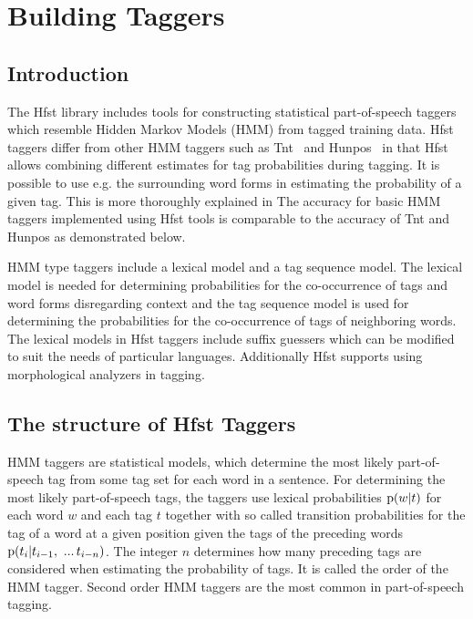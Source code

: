 \documentclass{llncs}
\begin{document}


\section{Building Taggers}\label{PosTools}

\subsection{Introduction}

The Hfst library includes tools for constructing statistical
part-of-speech taggers which resemble Hidden Markov Models (HMM) from
tagged training data. Hfst taggers differ from other HMM taggers such
as Tnt~\cite{Brants:2000} and Hunpos~\cite{Halascy:2007} in that Hfst
allows combining different estimates for tag probabilities during
tagging. It is possible to use e.g. the surrounding word forms in
estimating the probability of a given tag. This is more thoroughly
explained in \cite{silfverberg/2010/icetal,silfverberg/2011/nodalida} The
accuracy for basic HMM taggers implemented using Hfst tools is
comparable to the accuracy of Tnt and Hunpos as demonstrated below.

HMM type taggers include a lexical model and a tag sequence model. The
lexical model is needed for determining probabilities for the
co-occurrence of tags and word forms disregarding context and the tag
sequence model is used for determining the probabilities for the
co-occurrence of tags of neighboring words. The lexical models in
Hfst taggers include suffix guessers which can be modified to suit
the needs of particular languages. Additionally Hfst supports using
morphological analyzers in tagging.

\subsection{The structure of Hfst Taggers}

HMM taggers are statistical models, which determine the most likely
part-of-speech tag from some tag set for each word in a sentence. For
determining the most likely part-of-speech tags, the taggers use
lexical probabilities ${\rm p}(w|t)$ for each word $w$ and each tag
$t$ together with so called transition probabilities for the tag of a
word at a given position given the tags of the preceding words ${\rm
  p}(t_i | t_{i - 1},\ ...\, t_{i-n})$. The integer $n$ determines how
many preceding tags are considered when estimating the probability of
tags. It is called the order of the HMM tagger. Second order HMM
taggers are the most common in part-of-speech tagging.
\end{document}
